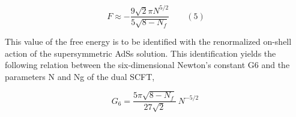 \documentclass{article}
\begin{document}
\begin{equation}
F \approx - \frac { 9 \sqrt { 2 } \pi N ^ { 5 / 2 } } { 5 \sqrt { 8 - N _ { f } } } \qquad ( 5 )
\end{equation}


This value of the free energy is to be identified with the renormalized on-shell action of the
supersymmetric AdSs solution. This identification yields the following relation between the
six-dimensional Newton's constant G6 and the parameters N and Ng of the dual SCFT,


\begin{equation}
G _ { 6 } = \frac { 5 \pi \sqrt { 8 - N _ { f } } } { 2 7 \sqrt { 2 } } ~ N ^ { - 5 / 2 } ~
\end{equation}
\end{document}
